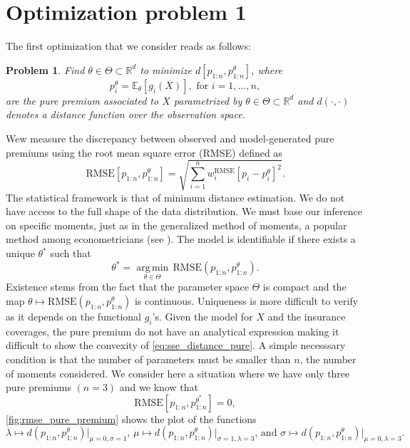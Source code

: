 \documentclass[10pt]{article}
\newtheorem{pb}{Problem}
\DeclareMathOperator*{\argmin}{arg\,min}
\begin{document}
\section{Optimization problem 1}\label{sec:problem1}
The first optimization that we consider reads as follows:
\begin{pb}\label{pb:optimization_problem_simple}
Find $\theta\in \Theta\subset\mathbb{R}^d$ to minimize \(d\left[p_{1:n}, p_{1:n}^\theta\right]\), where 
$$
p_i^\theta =\mathbb{E}_\theta\left[g_{i}(X)\right],\text{ for }i = 1,\ldots, n,
$$
are the pure premium associated to $X$ parametrized by $\theta\in \Theta\subset\mathbb{R}^d$ and $d(\cdot, \cdot)$ denotes a distance function over the observation space. 
\end{pb}
Wew measure the discrepancy between observed and model-generated pure premiums using the root mean square error (RMSE) defined as
\begin{equation}\label{eq:sse_distance_pure}
\text{RMSE}\left[p_{1:n}, p^\theta_{1:n}\right] = \sqrt{\sum_{i=1}^nw^{\text{RMSE}}_i [p_i - p_i^\theta]^2}.
\end{equation}
The statistical framework is that of minimum distance estimation. We do not have access to the full shape of the data distribution. We must base our inference on specific moments, just as in the generalized method of moments, a popular method among econometricians (see \citet{Hansen1982}). The model is identifiable if there exists a unique $\theta^\ast$ such that 
\begin{equation}\label{eq:optimization_knowing_pure_premium}
\theta^\ast  = \underset{\theta\in \Theta}{\argmin}\,\text{RMSE}(p_{1:n}, p_{1:n}^\theta).
\end{equation}
Existence stems from the fact that the parameter space $\Theta$ is compact and the map $\theta\mapsto\text{RMSE}(p_{1:n}, p_{1:n}^\theta)$ is continuous. Uniqueness is more difficult to verify as it depends on the functional $g_i$'s. Given the model for $X$ and the insurance coverages, the pure premium do not have an analytical expression making it difficult to show the convexity of \eqref{eq:sse_distance_pure}. A simple necesssary condition is that the number of parameters must be smaller than $n$, the number of moments considered. We consider here a situation where we have only three pure premiums $(n=3)$ and we know that 
$$
\text{RMSE}\left[p_{1:n}, p^{\theta^\ast}_{1:n}\right] = 0, 
$$
\cref{fig:rmse_pure_premium} shows the plot of the functions 
$$
\lambda\mapsto d\left(p_{1:n},p_{1:n}^{\theta}\right)\Big\rvert_{\mu =0, \sigma = 1}\text{, }\mu\mapsto d\left(p_{1:n},p_{1:n}^{\theta}\right)\Big\rvert_{\sigma =1, \lambda = 3}\text{, and }\sigma\mapsto d\left(p_{1:n},p_{1:n}^{\theta}\right)\big\rvert_{\mu =0, \lambda = 3}.
$$
\end{document}
